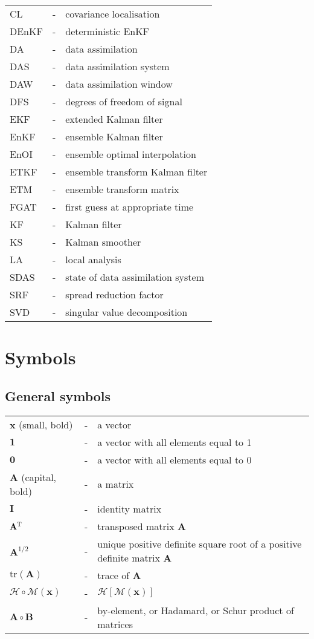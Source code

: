 \documentclass[11pt]{report}
\newcommand{\mb} {\mathbf}
\newcommand{\T}{^{\tiny \mathrm T}}
\begin{document}
\begin{tabular}{lll}
  CL &-& covariance localisation \\
  DEnKF &-& deterministic EnKF \\
  DA &-& data assimilation \\
  DAS &-& data assimilation system \\
  DAW &-& data assimilation window \\
  DFS &-& degrees of freedom of signal \\
  EKF &-& extended Kalman filter \\
  EnKF &-& ensemble Kalman filter \\
  EnOI &-& ensemble optimal interpolation \\
  ETKF &-& ensemble transform Kalman filter \\
  ETM &-& ensemble transform matrix \\
  FGAT &-& first guess at appropriate time \\
  KF &-& Kalman filter \\
  KS &-& Kalman smoother \\
  LA &-& local analysis \\
  SDAS &-& state of data assimilation system \\
  SRF &-& spread reduction factor \\
  SVD &-& singular value decomposition \\
\end{tabular}

\clearpage

\chapter*{Symbols}

\section*{General symbols}
\begin{tabular}{lll}
  $\mb x$ (small, bold) &-& a vector \\
  $\mb 1$ &-& a vector with all elements equal to 1 \\
  $\mb 0$ &-& a vector with all elements equal to 0 \\
  $\mb A$ (capital, bold) &-& a matrix \\
  $\mb I$ &-& identity matrix \\
  $\mb A\T$ &-& transposed matrix $\mb A$ \\
  $\mb A^{1/2}$ &-& unique positive definite square root of a positive definite matrix $\mb A$ \\
  $\mathrm{tr}(\mb A)$ &-& trace of $\mb A$ \\
  $\mathcal H \circ \mathcal M(\mb x)$ &-& $\mathcal H \left[ \mathcal M (\mb x) \right]$ \\
  $\mb A \circ \mb B$ &-& by-element, or Hadamard, or Schur product of matrices
\end{tabular}
\end{document}
